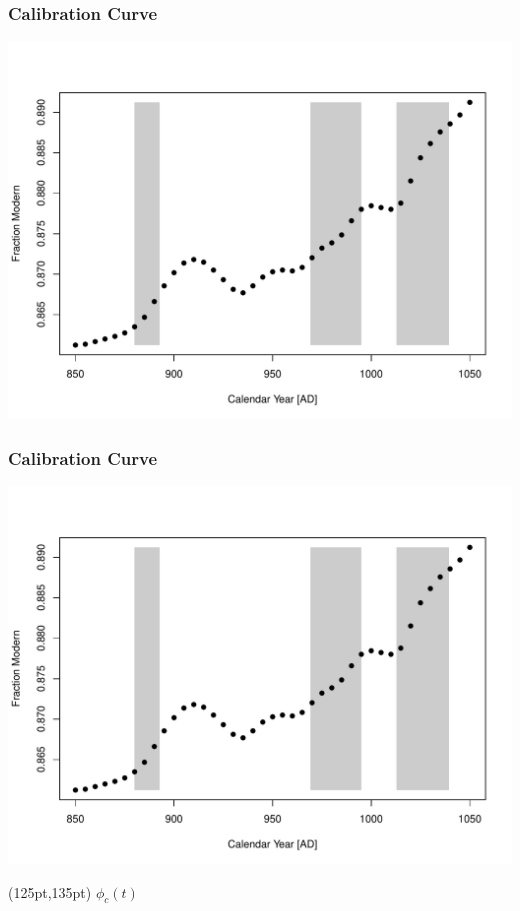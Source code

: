 \documentclass{beamer}
\begin{document}
\begin{frame}[t]
  \frametitle{Calibration Curve}
    \includegraphics[height=.85\textheight]{single_obs_inf_plot2.pdf}
\end{frame}

\begin{frame}[t]
  \frametitle{Calibration Curve}
    \includegraphics[height=.85\textheight]{single_obs_inf_plot2.pdf}
    \begin{textblock*}{100pt}(125pt,135pt)
      \Large $\phi_c(t)$ \normalsize
	\end{textblock*}   
\end{frame}
\end{document}
